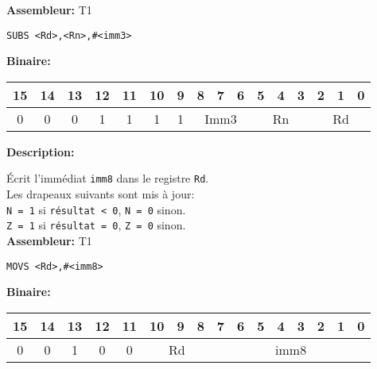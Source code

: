 \documentclass{article}
\begin{document}
    \textbf{Assembleur:} T1

    \begin{lstlisting}
SUBS <Rd>,<Rn>,#<imm3>
    \end{lstlisting}

    \textbf{Binaire:}\\

    \begin{tabular}{| c c c c c c c c c c c c c c c c |}
        \hline
        15 & 14 & 13 & \multicolumn{1}{|c}{12} & 11 & \multicolumn{1}{|c}{10} & \multicolumn{1}{|c}{9} & \multicolumn{1}{|c}{8} & 7 & 6 & \multicolumn{1}{|c}{5} & 4 & 3 & \multicolumn{1}{|c}{2} & 1 & 0 \\
        \hline
        0 & 0 & 0 & \multicolumn{1}{|c}{1} & 1 & \multicolumn{1}{|c}{1} & \multicolumn{1}{|c}{1} & \multicolumn{3}{|c|}{Imm3} & \multicolumn{3}{|c|}{Rn} & \multicolumn{3}{|c|}{Rd} \\
        \hline
    \end{tabular}



    \textbf{Description: }

    Écrit l'immédiat \texttt{imm8} dans le registre \texttt{Rd}.\\
    Les drapeaux suivants sont mis à jour:\\
    \texttt{N = 1} si \texttt{résultat < 0}, \texttt{N = 0} sinon.\\
    \texttt{Z = 1} si \texttt{résultat = 0}, \texttt{Z = 0} sinon.\\

    \textbf{Assembleur:} T1

    \begin{lstlisting}
MOVS <Rd>,#<imm8>
    \end{lstlisting}

    \textbf{Binaire:}\\

    \begin{tabular}{| c c c c c c c c c c c c c c c c |}
        \hline
        15 & 14 & 13 & \multicolumn{1}{|c}{12} & 11 & \multicolumn{1}{|c}{10} & 9 & 8 & \multicolumn{1}{|c}{7} & 6 & 5 & 4 & 3 & 2 & 1 & 0 \\
        \hline
        0 & 0 & 1 & \multicolumn{1}{|c}{0} & 0 & \multicolumn{3}{|c|}{Rd} & \multicolumn{8}{|c|}{imm8} \\
        \hline
    \end{tabular}
\end{document}
